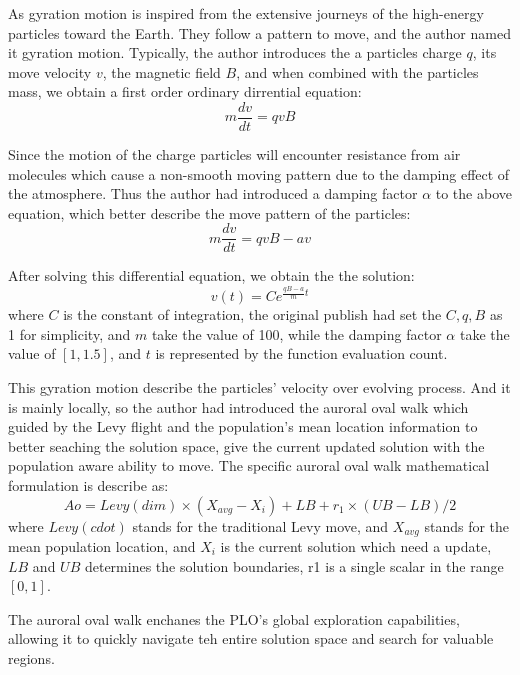 \documentclass[review]{elsarticle}
\begin{document}
As gyration motion is inspired from the extensive journeys of the high-energy particles toward the Earth. They follow a pattern to move, and the author named it gyration motion. Typically, the author introduces the a particles charge $q$, its move velocity $v$, the magnetic field $B$, and when combined with the particles mass, we obtain a first order ordinary dirrential equation:
\begin{equation}
m \frac{dv}{dt} = qvB
\end{equation}

Since the motion of the charge particles will encounter resistance from air molecules which cause a non-smooth moving pattern due to the damping effect of the atmosphere. Thus the author had introduced a damping factor $\alpha$ to the above equation, which better describe the move pattern of the particles:
\begin{equation}
m \frac{dv}{dt} = qvB - av
\end{equation}

After solving this differential equation, we obtain the the solution:
\begin{equation}
v(t) = Ce^{\frac{qB-a}{m}t}
\end{equation}
where $C$ is the constant of integration, the original publish had set the $C, q, B$ as 1 for simplicity, and $m$ take the value of 100, while the damping factor $\alpha$ take the value of $[1, 1.5]$, and $t$ is represented by the function evaluation count.

This gyration motion describe the particles' velocity over evolving process. And it is mainly locally, so the author had introduced the auroral oval walk which guided by the Levy flight and the population's mean location information to better seaching the solution space, give the current updated solution with the population aware ability to move. The specific auroral oval walk mathematical formulation is describe as:
\begin{equation}
Ao = Levy(dim) \times (X_{avg} - X_i) + LB + r_1 \times (UB - LB)/2
\end{equation}
where $Levy(cdot)$ stands for the traditional Levy move, and $X_{avg}$ stands for the mean population location, and $X_i$ is the current solution which need a update, $LB$ and $UB$ determines the solution boundaries, r1 is a single scalar in the range $[0, 1]$.

The auroral oval walk enchanes the PLO's global exploration capabilities, allowing it to quickly navigate teh entire solution space and search for valuable regions.
\end{document}
